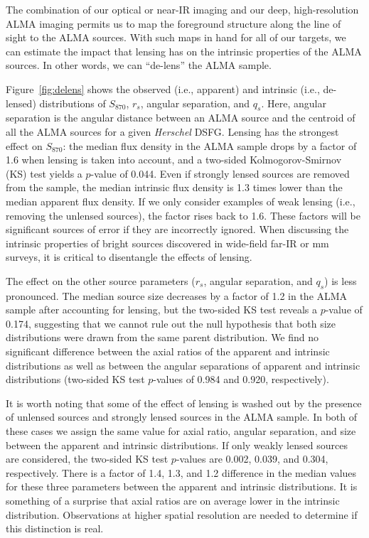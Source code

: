 \documentclass[iop]{emulateapj}
\begin{document}
The combination of our optical or near-IR imaging and our deep, high-resolution
ALMA imaging permits us to map the foreground structure along the line of sight
to the ALMA sources.  With such maps in hand for all of our targets, we can
estimate the impact that lensing has on the intrinsic properties of the ALMA
sources.  In other words, we can ``de-lens'' the ALMA sample.

Figure~\ref{fig:delens} shows the observed (i.e., apparent) and intrinsic
(i.e., de-lensed) distributions of $S_{870}$, $r_s$, angular separation, and
$q_s$.  Here, angular separation is the angular distance between an ALMA source
and the centroid of all the ALMA sources for a given {\it Herschel} DSFG.
Lensing has the strongest effect on $S_{870}$: the median flux density in the
ALMA sample drops by a factor of 1.6 when lensing is taken into account, and a
two-sided Kolmogorov-Smirnov (KS) test yields a $p$-value of 0.044.  Even
if strongly lensed sources are removed from the sample, the median intrinsic
flux density is 1.3 times lower than the median apparent flux density.  If we
only consider examples of weak lensing (i.e., removing the unlensed sources),
the factor rises back to 1.6.  These factors will be significant sources of
error if they are incorrectly ignored.  When discussing the intrinsic
properties of bright sources discovered in wide-field far-IR or mm surveys, it
is critical to disentangle the effects of lensing.

The effect on the other source parameters ($r_s$, angular separation, and
$q_s$) is less pronounced.  The median source size decreases by a factor of 1.2
in the ALMA sample after accounting for lensing, but the two-sided KS test
reveals a $p$-value of 0.174, suggesting that we cannot rule out the null
hypothesis that both size distributions were drawn from the same parent
distribution.  We find no significant difference between the axial ratios of
the apparent and intrinsic distributions as well as between the angular
separations of apparent and intrinsic distributions (two-sided KS test
$p$-values of 0.984 and 0.920, respectively). 

It is worth noting that some of the effect of lensing is washed out by the
presence of unlensed sources and strongly lensed sources in the ALMA sample.
In both of these cases we assign the same value for axial ratio, angular
separation, and size between the apparent and intrinsic distributions.  If only
weakly lensed sources are considered, the two-sided KS test $p$-values are
0.002, 0.039, and 0.304, respectively.  There is a factor of 1.4, 1.3, and 1.2
difference in the median values for these three parameters between the apparent
and intrinsic distributions.  It is something of a surprise that axial ratios
are on average lower in the intrinsic distribution.  Observations at higher
spatial resolution are needed to determine if this distinction is real.
\end{document}
